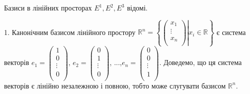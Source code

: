 \begin{example}
    Базиси в лінійних просторах $E^1, E^2, E^3$ відомі.
    
    1. Канонічним базисом лінійного простору
    $\mathbb{R}^n = \left\{\left.\begin{pmatrix}
        x_1  \\
        \vdots  \\
        x_n  \\
    \end{pmatrix}\right| x_i \in \mathbb{R}\right\}$
     є система векторів
    $e_1 = \begin{pmatrix}
        1  \\
        0  \\
        \vdots  \\
        0  \\
    \end{pmatrix}$, $e_2 = \begin{pmatrix}
        0  \\
        1  \\
        \vdots  \\
        0  \\
    \end{pmatrix}$, ...,$e_n = \begin{pmatrix}
        0  \\
        0  \\
        \vdots  \\
        1  \\
    \end{pmatrix}$. Доведемо, що ця система векторів є
    лінійно незалежною і повною, тобто може слугувати базисом $\mathbb{R}^n$.
    

\end{example}
